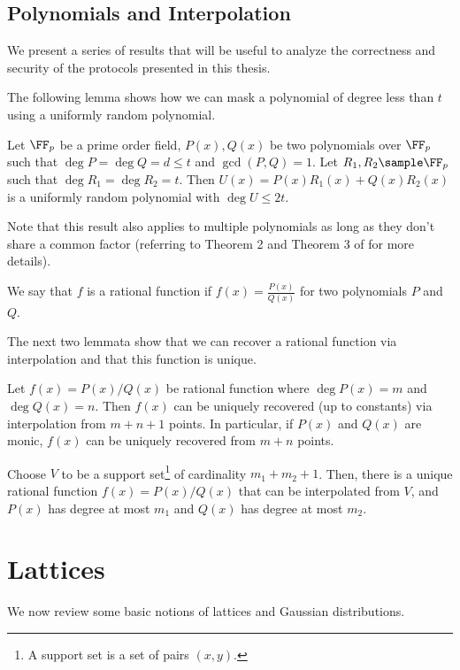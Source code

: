 \subsection{Polynomials and Interpolation}
We present a series of results that will be useful to analyze the correctness and security of the protocols presented in this thesis.

The following lemma shows how we can mask a polynomial of degree less than $t$ using a uniformly random polynomial.

\begin{lemma}
\label{lemma:randomPoly}
Let $\FF_p$ be a prime order field, $P(x),Q(x)$ be two polynomials over $\FF_p$ such that $\deg P =\deg Q=d\leq t$ and $\gcd(P,Q)=1$. Let $R_1,R_2\sample \FF_p$ such that $\deg R_1=\deg R_2=t$. Then $U(x)=P(x)R_1(x)+Q(x)R_2(x)$ is a uniformly random polynomial with $\deg U\leq 2t$.
\end{lemma}{}
Note that this result also applies to multiple polynomials as long as they don't share a common factor (referring to Theorem 2 and Theorem 3 of \cite{C:KisSon05} for more details).

We say that $f$ is a rational function if $f(x)=\frac{P(x)}{Q(x)}$ for two polynomials $P$ and $Q$.%

The next two lemmata show that we can recover a rational function via interpolation and that this function is unique.

\begin{lemma}
\label{lem:minsky}
Let $f(x)=P(x)/Q(x)$ be rational function where $\deg P(x)=m$ and $\deg Q(x)=n$. Then $f(x)$ can be uniquely recovered (up to constants) via interpolation from  $m+n+1$ points. In particular, if $P(x)$ and $Q(x)$ are monic, $f(x)$ can be uniquely recovered from $m+n$ points.
\end{lemma}



\begin{lemma}
\label{lem:unique-rational-func}
Choose $V$ to be a support set\footnote{A support set is a set of pairs $(x,y)$.} of cardinality $m_1+m_2+1$. Then, there is a unique rational function $f(x)=P(x)/Q(x)$  that can be interpolated from $V$, and $P(x)$ has degree at most $m_1$ and $Q(x)$ has degree at most $m_2$.
\end{lemma}

\section{Lattices}
We now review some basic notions of lattices and Gaussian distributions.


